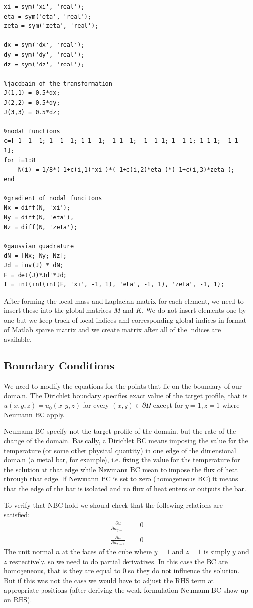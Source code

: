 \documentclass[unicode,11pt,a4paper,oneside,numbers=endperiod,openany]{scrartcl}
\begin{document}
\begin{lstlisting}[caption=Local assembly of Laplatian matrix]
xi = sym('xi', 'real');
eta = sym('eta', 'real');
zeta = sym('zeta', 'real');

dx = sym('dx', 'real');
dy = sym('dy', 'real');
dz = sym('dz', 'real');

%jacobain of the transformation
J(1,1) = 0.5*dx;
J(2,2) = 0.5*dy;
J(3,3) = 0.5*dz;

%nodal functions
c=[-1 -1 -1; 1 -1 -1; 1 1 -1; -1 1 -1; -1 -1 1; 1 -1 1; 1 1 1; -1 1 1];
for i=1:8
    N(i) = 1/8*( 1+c(i,1)*xi )*( 1+c(i,2)*eta )*( 1+c(i,3)*zeta );
end

%gradient of nodal funcitons
Nx = diff(N, 'xi');
Ny = diff(N, 'eta');
Nz = diff(N, 'zeta');

%gaussian quadrature
dN = [Nx; Ny; Nz];
Jd = inv(J) * dN;
F = det(J)*Jd'*Jd;
I = int(int(int(F, 'xi', -1, 1), 'eta', -1, 1), 'zeta', -1, 1);
\end{lstlisting}



After forming the local mass and Laplacian matrix for each element, we need to insert these into the global matrices $M$ and $K$. We do not insert elements one by one but we keep track of local indices and corresponding global indices in format of Matlab sparse matrix and we create matrix after all of the indices are available.

\subsection{Boundary Conditions}
We need to modify the equations for the points that lie on the boundary of our domain. The Dirichlet boundary specifies exact value of the target profile, that is $u(x,y,z) = u_0(x,y,z)$ for every $(x,y) \in \partial\Omega$ except for $y=1,z=1$ where Neumann BC apply.

Neumann BC specify not the target profile of the domain, but the rate of the change of the domain. Basically, a Dirichlet BC means imposing the value for the temperature (or some other physical quantity) in one edge of the dimensional domain (a metal bar, for example), i.e. fixing the value for the temperature for the solution at that edge while Newmann BC mean to impose the flux of heat through that edge. If Newmann BC is set to zero (homogeneous BC) it means that the edge of the bar is isolated and no flux of heat enters or outputs the bar.

To verify that NBC hold we should check that the following relations are satisfied:
\begin{align}
    \frac{\partial u}{\partial n_{y=1}} &= 0 \\
    \frac{\partial u}{\partial n_{z=1}} &= 0
\end{align}
The unit normal $n$ at the faces of the cube where $y=1$ and $z=1$ is simply $y$ and $z$ respectively, so we need to do partial derivatives. In this case the BC are homogeneous, that is they are equal to $0$ so they do not influence the solution. But if this was not the case we would have to adjust the RHS term at appropriate positions (after deriving the weak formulation Neumann BC show up on RHS).
\end{document}

